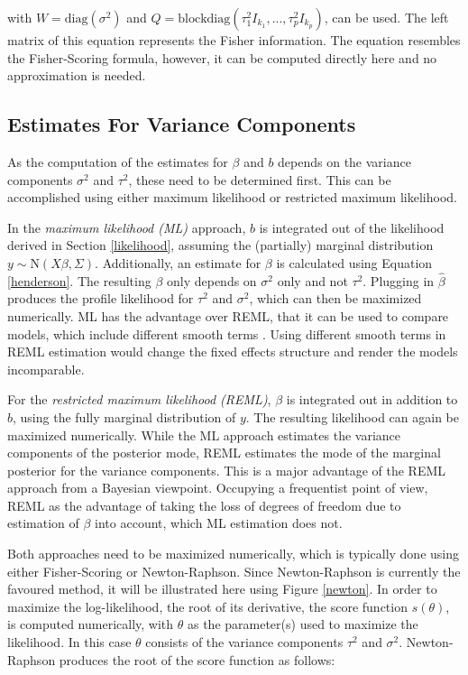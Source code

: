 \documentclass[12pt]{article}
\begin{document}
 with $W=\text{diag}(\sigma^2)$ and $Q=\text{blockdiag}(\tau_1^2I_{k_1},..., \tau_p^2I_{k_p})$, can be used. The left matrix of this equation represents the Fisher information. The equation resembles the Fisher-Scoring formula, however, it can be computed directly here and no approximation is needed.
 
 \subsection{Estimates For Variance Components}\label{varianceestimates}

As the computation of the estimates for $\beta$ and $b$ depends on the variance components $\sigma^2$ and $\tau^2$, these need to be determined first. This can be accomplished using either maximum likelihood or restricted maximum likelihood. 

In the \textit{maximum likelihood (ML)} approach, $b$ is integrated out of the likelihood derived in Section \ref{likelihood}, assuming the (partially) marginal distribution $y \sim \mathrm{N}(X\beta,\Sigma)$. Additionally, an estimate for $\beta$ is calculated using Equation \ref{henderson}. The resulting $\beta$ only depends on $\sigma^2$ only and not $\tau^2$. Plugging in $\hat{\beta}$ produces the profile likelihood for $\tau^2$ and $\sigma^2$, which can then be maximized numerically. ML has the advantage over REML, that it can be used to compare models, which include different smooth terms \cite{wood2011fast}. Using different smooth terms in REML estimation would change the fixed effects structure and render the models incomparable.

For the \textit{restricted maximum likelihood (REML)}, $\beta$ is integrated out in addition to $b$, using the fully marginal distribution of $y$. The resulting likelihood can again be maximized numerically.
While the ML approach estimates the variance components of the posterior mode, REML estimates the mode of the marginal posterior for the variance components. This is a major advantage of the REML approach from a Bayesian viewpoint. Occupying a frequentist point of view, REML as the advantage of taking the loss of degrees of freedom due to estimation of $\beta$ into account, which ML estimation does not.

Both approaches need to be maximized numerically, which is typically done using either Fisher-Scoring or Newton-Raphson. Since Newton-Raphson is currently the favoured method, it will be illustrated here using Figure \ref{newton}. In order to maximize the log-likelihood, the root of its derivative, the score function $s(\theta)$, is computed numerically, with $\theta$ as the parameter(s) used to maximize the likelihood. In this case $\theta$ consists of the variance components $\tau^2$ and $\sigma^2$. 
Newton-Raphson produces the root of the score function as follows:
\end{document}
